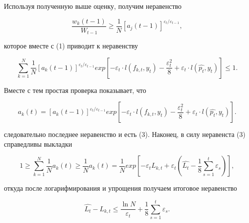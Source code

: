 \documentclass{article}
\begin{document}
Используя полученную выше оценку, получим неравенство

\[
\frac{w_k(t-1)}{W_{t-1}} \ge \frac{1}{N} [a_j(t-1)]^{\varepsilon_t / \varepsilon_{t-1}},
\]

которое вместе с (1) приводит к неравенству

\[
\sum^N_{k=1} \frac{1}{N} [a_k(t-1)]^{\varepsilon_t / \varepsilon_{t-1}} exp [-\varepsilon_t \cdot l(f_{k,t}, y_t) - 
\frac{\varepsilon^2_t}{8} + \varepsilon_t \cdot l(\hat{p_t}, y_t) ] \le 1.
\]

Вместе с тем простая проверка показывает, что
 
\[
a_k(t) = [a_k(t-1)]^{\varepsilon_t / \varepsilon_{t-1}} exp [-\varepsilon_t \cdot l(f_{k,t}, y_t) - 
\frac{\varepsilon^2_t}{8} + \varepsilon_t \cdot l(\hat{p_t}, y_t) ].
\]

следовательно последнее неравенство и есть (3). Наконец, в силу неравенста (3) справедливы выкладки

\[
1 \ge \sum^N_{k=1} \frac{1}{N} a_k(t) \ge \frac{1}{N} a_k(t) = \frac{1}{N}  exp [-\varepsilon_t L_{k,t} + \varepsilon_t (\hat{L_t} - \frac{1}{8} \sum^t_{s=1} \varepsilon_s )],
\]

откуда после логарифмирования и упрощения получаем итоговое неравенство

\[
\hat{L_t} - L_{k,t} \le \frac{\ln{N}}{\varepsilon_t} + \frac{1}{8} \sum^t_{s=1} \varepsilon_s.
\]
\end{document}
